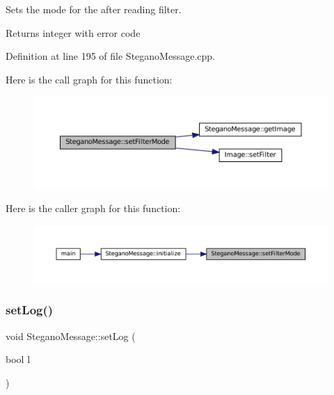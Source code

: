 Sets the mode for the after reading filter. 

\begin{DoxyReturn}{Returns}
integer with error code 
\end{DoxyReturn}


Definition at line 195 of file Stegano\+Message.\+cpp.

Here is the call graph for this function\+:\nopagebreak
\begin{figure}[H]
\begin{center}
\leavevmode
\includegraphics[width=350pt]{classSteganoMessage_a5c3ef910b17f4bbe32a73a33be9d7586_cgraph}
\end{center}
\end{figure}
Here is the caller graph for this function\+:\nopagebreak
\begin{figure}[H]
\begin{center}
\leavevmode
\includegraphics[width=350pt]{classSteganoMessage_a5c3ef910b17f4bbe32a73a33be9d7586_icgraph}
\end{center}
\end{figure}
\mbox{\label{classSteganoMessage_a438e9d5189a8e3b83021fada4a6a469c}} 
\subsubsection{\texorpdfstring{setLog()}{setLog()}}
{\footnotesize\ttfamily void Stegano\+Message\+::set\+Log (\begin{DoxyParamCaption}\item[{bool}]{l }\end{DoxyParamCaption})}



